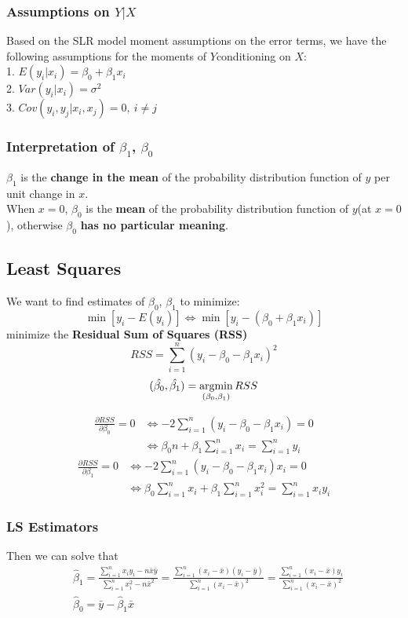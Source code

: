 \documentclass[11pt,a4paper]{article}
\newcommand{\argmin}{\operatornamewithlimits{argmin}}
\begin{document}
\subsubsection{Assumptions on $Y|X$}
Based on the SLR model moment assumptions on the error terms, we have the following assumptions for the moments of $Y $conditioning on $X$:\\
1. $E(y_i|x_i)=\beta_0+\beta_1x_i$\\
2. $Var(y_i|x_i)=\sigma^2$\\
3. $Cov(y_i,y_j|x_i,x_j)=0,\ i\neq j$
\subsubsection{Interpretation of $\beta_1$, $\beta_0$}
$\beta_1$ is the \textbf{change in the mean} of the probability distribution function of $y$ per unit change in $x$.\\
When $x=0$, $\beta_0$ is the \textbf{mean} of the probability distribution function of $y$(at $x=0$), otherwise $\beta_0$ \textbf{has no particular meaning}.\\

\subsection{Least Squares}
We want to find estimates of $\beta_0$, $\beta_1$ to minimize:
$$\min [y_i-E(y_i)]\Leftrightarrow \min [y_i-(\beta_0+\beta_1 x_i)]$$
minimize the \textbf{Residual Sum of Squares (RSS)}
$$RSS=\sum_{i=1}^n(y_i-\beta_0-\beta_1 x_i)^2$$
$$(\hat{\beta_0},\hat{\beta_1})=\argmin_{(\beta_0,\beta_1)}RSS$$

$$\begin{aligned}
    \frac{\partial RSS}{\partial \beta_0}=0 &\Leftrightarrow -2\sum_{i=1}^n(y_i-\beta_0-\beta_1 x_i)=0\\
    & \Leftrightarrow \beta_0 n+\beta_1\sum_{i=1}^n x_i=\sum_{i=1}^n y_i
\end{aligned}$$
$$\begin{aligned}
    \frac{\partial RSS}{\partial \beta_1}=0 &\Leftrightarrow -2\sum_{i=1}^n(y_i-\beta_0-\beta_1 x_i)x_i=0\\
    &\Leftrightarrow \beta_0 \sum_{i=1}^nx_i+\beta_1\sum_{i=1}^n x_i^2=\sum_{i=1}^n x_iy_i
\end{aligned}$$

\subsubsection{LS Estimators}
Then we can solve that
$$\begin{aligned}
&\hat{\beta}_{1}=\frac{\sum_{i=1}^{n} x_{i} y_{i}-n \bar{x} \bar{y}}{\sum_{i=1}^{n} x_{i}^{2}-n \bar{x}^{2}}=\frac{\sum_{i=1}^{n}\left(x_{i}-\bar{x}\right)\left(y_{i}-\bar{y}\right)}{\sum_{i=1}^{n}\left(x_{i}-\bar{x}\right)^{2}}=\frac{\sum_{i=1}^{n}\left(x_{i}-\bar{x}\right)y_{i}}{\sum_{i=1}^{n}\left(x_{i}-\bar{x}\right)^{2}} \\
&\hat{\beta}_{0}=\bar{y}-\hat{\beta}_{1} \bar{x}
\end{aligned}$$
\end{document}
